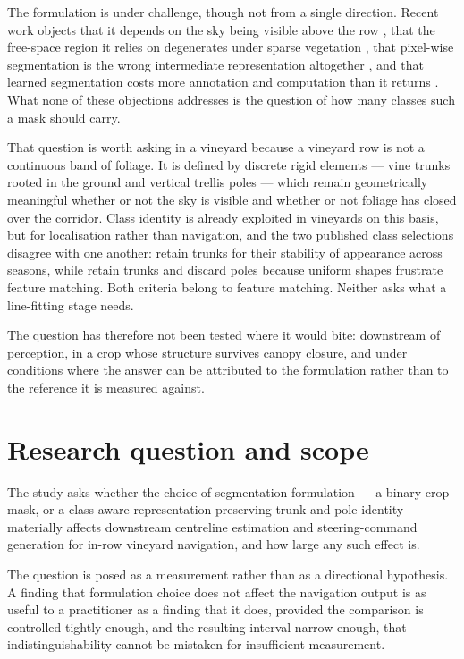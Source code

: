 The formulation is under challenge, though not from a single direction.
Recent work objects that it depends on the sky being visible above the row
\citep{navone2025}, that the free-space region it relies on degenerates under
sparse vegetation \citep{liu2023}, that pixel-wise segmentation is the wrong
intermediate representation altogether \citep{sivakumar2024}, and that learned
segmentation costs more annotation and computation than it returns
\citep{ahmadi2022}. What none of these objections addresses is the question of
how many classes such a mask should carry.

That question is worth asking in a vineyard because a vineyard row is not a
continuous band of foliage. It is defined by discrete rigid elements --- vine
trunks rooted in the ground and vertical trellis poles --- which remain
geometrically meaningful whether or not the sky is visible and whether or not
foliage has closed over the corridor. Class identity is already exploited in
vineyards on this basis, but for localisation rather than navigation, and the
two published class selections disagree with one another: \citet{papadimitriou2022}
retain trunks for their stability of appearance across seasons, while
\citet{desilva2025} retain trunks and discard poles because uniform shapes
frustrate feature matching. Both criteria belong to feature matching. Neither
asks what a line-fitting stage needs.

The question has therefore not been tested where it would bite: downstream of
perception, in a crop whose structure survives canopy closure, and under
conditions where the answer can be attributed to the formulation rather than
to the reference it is measured against.

\section{Research question and scope}
\label{sec:intro-question}

The study asks whether the choice of segmentation formulation --- a binary
crop mask, or a class-aware representation preserving trunk and pole identity
--- materially affects downstream centreline estimation and steering-command
generation for in-row vineyard navigation, and how large any such effect is.

The question is posed as a measurement rather than as a directional
hypothesis. A finding that formulation choice does not affect the navigation
output is as useful to a practitioner as a finding that it does, provided the
comparison is controlled tightly enough, and the resulting interval narrow
enough, that indistinguishability cannot be mistaken for insufficient
measurement.

